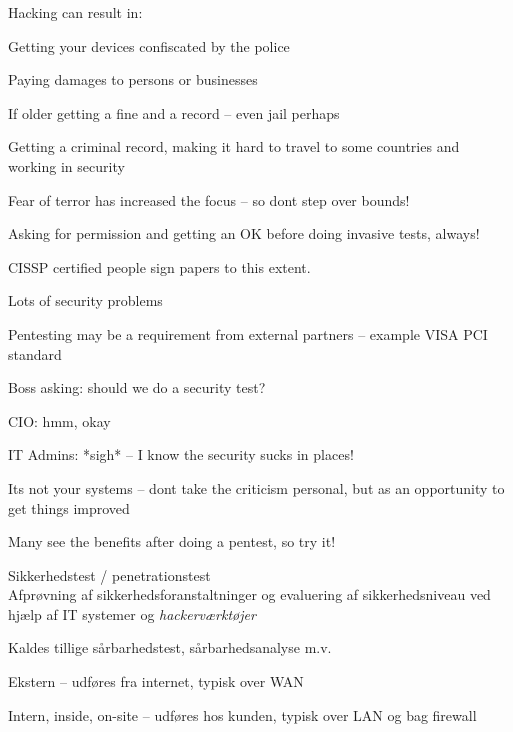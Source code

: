 \documentclass[Screen16to9,17pt]{foils}
\begin{document}
Hacking can result in:
\begin{list2}
\item Getting your devices confiscated by the police
\item Paying damages to persons or businesses
\item If older getting a fine and a record -- even jail perhaps
\item Getting a criminal record, making it hard to travel to some countries and working in security
\item Fear of terror has increased the focus -- so dont step over bounds!
\end{list2}

Asking for permission and getting an OK before doing invasive tests, always!



CISSP certified people sign papers to this extent.\\



\begin{list1}
\item Lots of security problems
\item Pentesting may be a requirement from external partners -- example VISA PCI standard
\end{list1}

\begin{list2}
\item Boss asking: should we do a security test?
\item CIO: hmm, okay
\item IT Admins: *sigh* -- I know the security sucks in places!
\item Its not your systems -- dont take the criticism personal, but as an opportunity to get things improved
\end{list2}

\vskip 2cm
\centerline{\Large Many see the benefits after doing a pentest, so try it!}



\begin{list1}
\item Sikkerhedstest / penetrationstest\\
Afprøvning af sikkerhedsforanstaltninger og evaluering af
sikkerhedsniveau ved hjælp af IT systemer og \emph{hackerværktøjer}
\item Kaldes tillige sårbarhedstest, sårbarhedsanalyse m.v.
\item Ekstern -- udføres fra internet, typisk over WAN
\item Intern, inside, on-site -- udføres hos kunden, typisk over LAN og
  bag firewall
\end{list1}
\end{document}
